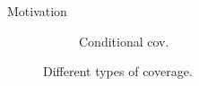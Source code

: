 \documentclass{beamer}
\newcommand{\R}{\mathbb{R}}
\renewcommand{\P}{\mathbb{P}}
\newcommand{\Ca}{\mathcal{C}_{\alpha}}
\renewcommand{\a}{\alpha}
\begin{document}
\begin{frame}{Motivation}
\begin{itemize}
\begin{figure}[ht]
\begin{subfigure}[b]{0.3\textwidth}
            \caption{Conditional cov.}
            \label{fig:coverage:cond-cover}
        \end{subfigure}
        \caption{Different types of coverage. %
        }
        \label{fig:coverage}
    \end{figure}
    \end{itemize}
\end{frame}


\end{document}
